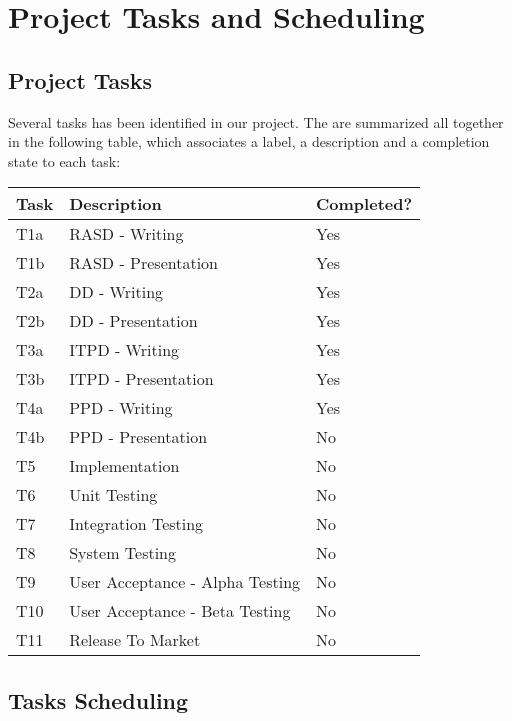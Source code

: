 \section{Project Tasks and Scheduling}
%
\subsection{Project Tasks}
Several tasks has been identified in our project.
The are summarized all together in the following table, which associates a label, a description and a completion state to each task:
\begin{center}
	\begin{tabulary}{\linewidth\tymin=70pt}{Y{2cm}|Y{6cm}|Y{2.25cm}}
		\textbf{Task} & \textbf{Description} & \textbf{Completed?}\\ \hline
		T1a & RASD - Writing & Yes \\ \hline
		T1b & RASD - Presentation & Yes \\ \hline
		T2a & DD - Writing & Yes \\ \hline
		T2b & DD - Presentation & Yes \\ \hline
		T3a & ITPD - Writing & Yes \\ \hline
		T3b & ITPD - Presentation & Yes \\ \hline
		T4a & PPD - Writing & Yes \\ \hline
		T4b & PPD - Presentation & No \\ \hline
		T5 & Implementation & No \\ \hline
		T6 & Unit Testing & No \\ \hline
		T7 & Integration Testing & No \\ \hline
		T8 & System Testing & No \\ \hline
		T9 & User Acceptance - Alpha Testing & No \\ \hline
		T10 & User Acceptance - Beta Testing & No \\ \hline
		T11 & Release To Market & No \\
	\end{tabulary}
\end{center}
%
\subsection{Tasks Scheduling}
\lipsum[100]
%
